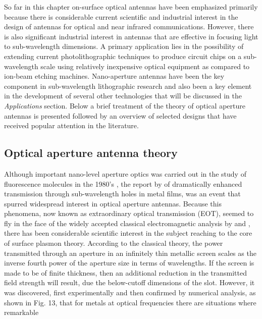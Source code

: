 \documentclass[11pt]{article}
\begin{document}
So far in this chapter on-surface optical antennas have been emphasized primarily because there is considerable current scientific and industrial interest in the design of antennas for optical and near infrared communications. However, there is also significant industrial interest in antennas that are effective in focusing light to sub-wavelength dimensions. A primary application lies in the possibility of extending current photolithographic techniques to produce circuit chips on a sub-wavelength scale using relatively inexpensive optical equipment as compared to ion-beam etching machines. Nano-aperture antennas have been the key component in sub-wavelength lithographic research and also been a key element in the development of several other technologies that will be discussed in the \emph{Applications} section. Below a brief treatment of the theory of optical aperture antennas is presented followed by an overview of selected designs that have received popular attention in the literature.
\subsection{Optical aperture antenna theory}

Although important nano-level aperture optics was carried out in the study of fluorescence molecules in the 1980's \cite{Fischer1986}, the report by \cite{Ebbesen1998} of dramatically enhanced transmission through sub-wavelength holes in metal films, was an event that spurred widespread interest in optical aperture antennas. Because this phenomena, now known as extraordinary optical transmission (EOT), seemed to fly in the face of the widely accepted classical electromagnetic analysis by \cite{Bethe1944} and \cite{Bouwkamp1950}, there has been considerable scientific interest in the subject reaching to the core of surface plasmon theory. According to the classical theory, the power transmitted through an aperture in an infinitely thin metallic screen scales as the inverse fourth power of the aperture size in terms of wavelengths. If the screen is made to be of finite thickness, then an additional reduction in the transmitted field strength will result, due the below-cutoff dimensions of the slot. However, it was discovered, first experimentally and then confirmed by numerical analysis, as shown in Fig. 13, that for metals at optical frequencies there are situations where remarkable

\end{document}
